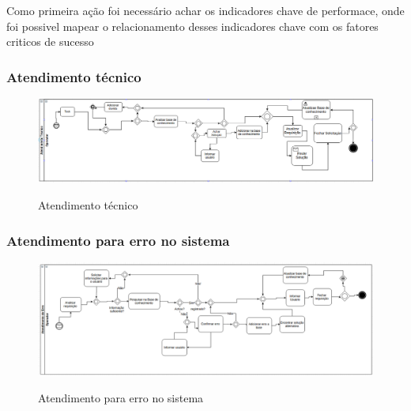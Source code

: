 Como primeira ação foi necessário achar os indicadores chave de performace,
onde foi possivel mapear o relacionamento desses indicadores chave com os fatores
\cite{cartlidge2007introductory} criticos de sucesso

\subsubsection{Atendimento técnico}
\begin{figure}[!h]
\caption{Atendimento técnico}
\centering %
\includegraphics[width=15cm]{to_be/02_atendimento_tecnico.png}
\label{figura:suporte_tecnico_to_be}
\end{figure}



\subsubsection{Atendimento para erro no sistema}

\begin{figure}[!h]
\caption{Atendimento para erro no sistema}
\centering %
\includegraphics[width=15cm]{to_be/03_atendimento_de_erro.png}
\label{figura:atendimento_de_erro_to_be}
\end{figure}
